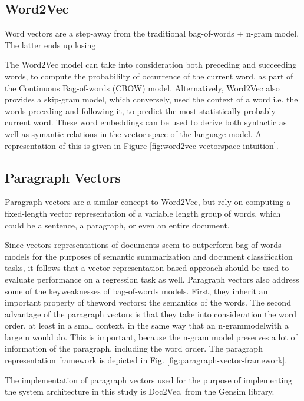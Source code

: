 \documentclass[conference]{IEEEtran}
\begin{document}
    \subsection{Word2Vec} \label{Word2Vec}
    Word vectors are a step-away from the traditional bag-of-words + n-gram model. The latter ends up losing

    The Word2Vec model\cite{mikolov2013efficient} can take into consideration both preceding and succeeding words, to compute the probabililty of occurrence of the current word, as part of the Continuous Bag-of-words (CBOW) model. Alternatively, Word2Vec also provides a skip-gram model\cite{mikolov2013distributed}, which conversely, used the context of a word i.e. the words preceding and following it, to predict the most statistically probably current word. These word embeddings can be used to derive both syntactic as well as symantic relations in the vector space of the language model. A representation of this is given in Figure \ref{fig:word2vec-vectorspace-intuition}.

    \subsection{Paragraph Vectors}
    Paragraph vectors are a similar concept to Word2Vec, but rely on computing a fixed-length vector representation of a variable length group of words, which could be a sentence, a paragraph, or even an entire document.

    Since vectors representations of documents seem to outperform bag-of-words models for the purposes of semantic summarization and document classification tasks, it follows that a vector representation based approach should be used to evaluate performance on a regression task as well. Paragraph vectors also address some of the keyweaknesses of bag-of-words models. First, they inherit an important property of theword vectors: the semantics of the words. The second advantage of the paragraph vectors is that they take into consideration the word order, at least in a small context, in the same way that an n-grammodelwith a large n would do. This is important, because the n-gram model preserves a lot of information of the paragraph, including the word order\cite{le2014distributed}. The paragraph representation framework is depicted in Fig. \ref{fig:paragraph-vector-framework}.

    The implementation of paragraph vectors used for the purpose of implementing the system architecture in this study is Doc2Vec, from the Gensim library\cite{doc2vec_api}.
\end{document}
